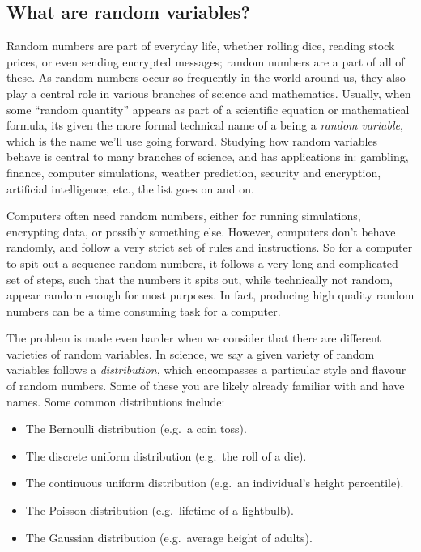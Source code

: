 \documentclass[11pt,a4paper,twoside,english]{extarticle}
\begin{document}
\subsection{What are random variables?}

Random numbers are part of everyday life, whether rolling dice, reading stock prices, or even sending encrypted messages; random numbers are a part of all of these. As random numbers occur so frequently in the world around us, they also play a central role in various branches of science and mathematics. Usually, when some ``random quantity'' appears as part of a scientific equation or mathematical formula, its given the more formal technical name of a being a \emph{random variable}, which is the name we'll use going forward. Studying how random variables behave is central to many branches of science, and has applications in: gambling, finance, computer simulations, weather prediction, security and encryption, artificial intelligence, etc., the list goes on and on.  

Computers often need random numbers, either for running simulations, encrypting data, or possibly something else. However, computers don't behave randomly, and follow a very strict set of rules and instructions. So for a computer to spit out a sequence random numbers, it follows a very long and complicated set of steps, such that the numbers it spits out, while technically not random, appear random enough for most purposes. In fact, producing high quality random numbers can be a time consuming task for a computer.

The problem is made even harder when we consider that there are different varieties of random variables. In science, we say a given variety of random variables follows a \emph{distribution}, which encompasses a particular style and flavour of random numbers. Some of these you are likely already familiar with and  have names. Some common distributions include:
\begin{itemize}
\item The Bernoulli distribution (e.g.\ a coin toss).
\item The discrete uniform distribution (e.g.\ the roll of a die).
\item The continuous uniform distribution (e.g.\ an individual's height percentile).
\item The Poisson distribution (e.g.\ lifetime of a lightbulb). 
\item The Gaussian distribution (e.g.\ average height of adults).
\end{itemize}
\end{document}
